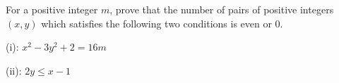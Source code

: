For a positive integer $m$, prove that the number of pairs of positive integers $(x,y)$ which satisfies the following two conditions is even or $0$.

(i): $x^2-3y^2+2=16m$

(ii): $2y \le x-1$